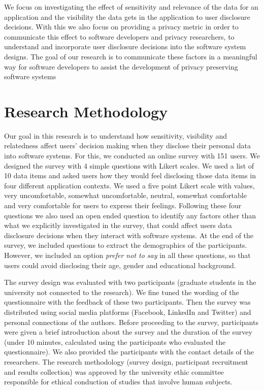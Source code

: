 \documentclass[conference]{IEEEtran}
\begin{document}
We focus on investigating the effect of sensitivity and relevance of the data for an application and the visibility the data gets in the application to user disclosure decisions. With this we also focus on providing a privacy metric in order to communicate this effect to software developers and privacy researchers, to understand and incorporate user disclosure decisions into the software system designs. The goal of our research is to communicate these factors in a meaningful way for software developers to assist the development of privacy preserving software systems


\section {Research Methodology}

Our goal in this research is to understand how sensitivity, visibility and relatedness affect users' decision making when they disclose their personal data into software systems. For this, we conducted an online survey with 151 users. We designed the survey with 4 simple questions with Likert scales. We used a list of 10 data items and asked users how they would feel disclosing those data items in four different application contexts. We used a five point Likert scale with values, very uncomfortable, somewhat uncomfortable, neutral, somewhat comfortable and very comfortable for users to express their feelings. Following these four questions we also used an open ended question to identify any factors other than what we explicitly investigated in the survey, that could affect users data disclosure decisions when they interact with software systems. At the end of the survey, we included questions to extract the demographics of the participants. However, we included an option \textit{prefer not to say} in all these questions, so that users could avoid disclosing their age, gender and educational background.

The survey design was evaluated with two participants (graduate students in the university not connected to the research). We fine tuned the wording of the questionnaire with the feedback of these two participants. Then the survey was distributed using social media platforms (Facebook, LinkedIn and Twitter) and personal connections of the authors. Before proceeding to the survey, participants were given a brief introduction about the survey and the duration of the survey (under 10 minutes, calculated using the participants who evaluated the questionnaire). We also provided the participants with the contact details of the researchers. The research methodology (survey design, participant recruitment and results collection) was approved by the university ethic committee responsible for ethical conduction of studies that involve human subjects.
\end{document}
